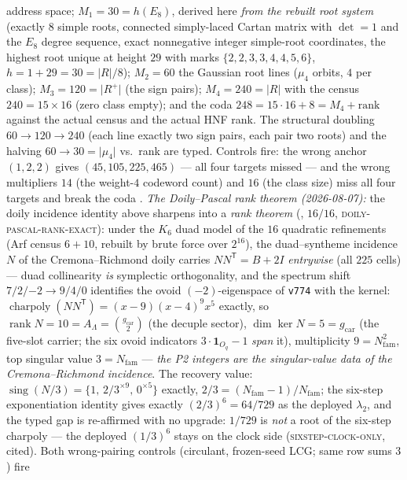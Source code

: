 \documentclass[11pt,a4paper]{article}
\newcommand{\gcar}{g_{\mathrm{car}}}
\newcommand{\Nfam}{N_{\mathrm{fam}}}
\theoremstyle{definition}
\begin{document}
\begin{keybox}
address space; $M_1 = 30 = h(E_8)$, derived here \emph{from the
rebuilt root system} (exactly $8$ simple roots, connected
simply-laced Cartan matrix with $\det = 1$ and the $E_8$ degree
sequence, exact nonnegative integer simple-root coordinates, the
highest root unique at height $29$ with marks
$\{2,2,3,3,4,4,5,6\}$, $h = 1 + 29 = 30 = \lvert R\rvert/8$);
$M_2 = 60$ the Gaussian root lines ($\mu_4$ orbits, $4$ per
class); $M_3 = 120 = \lvert R^+\rvert$ (the sign pairs);
$M_4 = 240 = \lvert R\rvert$ with the census $240 = 15\times16$
(zero class empty); and the coda $248 = 15\cdot16 + 8 = M_4 +
\mathrm{rank}$ against the actual census and the actual HNF rank.
The structural doubling $60 \to 120 \to 240$ (each line exactly
two sign pairs, each pair two roots) and the halving $60 \to 30 =
\lvert\mu_4\rvert$ vs.\ rank are typed.  Controls fire: the wrong
anchor $(1,2,2)$ gives $(45, 105, 225, 465)$ --- all four targets
missed --- and the wrong multipliers $14$ (the weight-$4$
codeword count) and $16$ (the class size) miss all four targets
and break the coda \mE.
\emph{The Doily--Pascal rank theorem (2026-08-07):} the doily
incidence identity above sharpens into a \emph{rank theorem}
(, $16/16$,
\textsc{doily-pascal-rank-exact}): under the $K_6$ duad model of
the $16$ quadratic refinements (Arf census $6 + 10$, rebuilt by
brute force over $2^{16}$), the duad--syntheme incidence $N$ of
the Cremona--Richmond doily carries $NN^{\mathsf T} = B + 2I$
\emph{entrywise} (all $225$ cells) --- duad collinearity
\emph{is} symplectic orthogonality, and the spectrum shift
$7/2/{-2} \to 9/4/0$ identifies the ovoid $(-2)$-eigenspace of
\texttt{v774} with the kernel: $\operatorname{charpoly}
(NN^{\mathsf T}) = (x-9)(x-4)^9x^5$ exactly, so
$\operatorname{rank} N = 10 = A_\Lambda = \binom{\gcar}{2}$ (the
decuple sector), $\dim\ker N = 5 = \gcar$ (the five-slot
carrier; the six ovoid indicators $3\cdot\mathbf 1_{O_q} - 1$
\emph{span} it), multiplicity $9 = \Nfam^2$, top singular value
$3 = \Nfam$ --- \emph{the P2 integers are the singular-value
data of the Cremona--Richmond incidence}.  The recovery value:
$\operatorname{sing}(N/3) = \{1,\, 2/3^{\times9},\,
0^{\times5}\}$ exactly, $2/3 = (\Nfam - 1)/\Nfam$; the six-step
exponentiation identity gives exactly $(2/3)^6 = 64/729$ as the
deployed $\lambda_2$, and the typed gap is re-affirmed with no
upgrade: $1/729$ is \emph{not} a root of the six-step charpoly
--- the deployed $(1/3)^6$ stays on the clock side
(\textsc{sixstep-clock-only}, cited).  Both wrong-pairing
controls (circulant, frozen-seed LCG; same row sums $3$) fire

\end{keybox}
\end{document}
